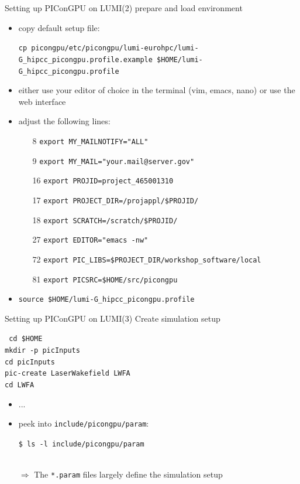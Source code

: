 \documentclass[
  aspectratio=169,
  10pt
]{beamer}
\newcommand{\terminal}[1]{\par\noindent\colorbox{shadecolor}
{\parbox{\dimexpr\textwidth-2\fboxsep\relax}{\texttt{#1}}}}
\begin{document}
\begin{frame}[t,fragile]{Setting up PIConGPU on LUMI}{(2) prepare and load environment}

\begin{itemize}
    \item copy default setup file:
    \terminal{cp picongpu/etc/picongpu/lumi-eurohpc/lumi-G\_hipcc\_picongpu.profile.example \$HOME/lumi-G\_hipcc\_picongpu.profile}

    \item either use your editor of choice in the terminal (vim, emacs, nano) or use the web interface 
    \item adjust the following lines:
    \begin{enumerate}
        \item[8] \texttt{export MY\_MAILNOTIFY="ALL"}
        \item[9] \texttt{export MY\_MAIL="your.mail@server.gov"}
        \item[16] \texttt{export PROJID=project\_465001310}
        \item[17] \texttt{export PROJECT\_DIR=/projappl/\$PROJID/}
        \item[18] \texttt{export SCRATCH=/scratch/\$PROJID/}
        \item[27] \texttt{export EDITOR="emacs -nw"}
        \item[72] \texttt{export PIC\_LIBS=\$PROJECT\_DIR/workshop\_software/local}
        \item[81] \texttt{export PICSRC=\$HOME/src/picongpu}
    \end{enumerate}
\item \terminal{source \$HOME/lumi-G\_hipcc\_picongpu.profile}
    
\end{itemize}

\end{frame}




\begin{frame}[t,fragile]{Setting up PIConGPU on LUMI}{(3) Create simulation setup}
    \terminal{%
        cd \$HOME \\
        mkdir -p picInputs\\
        cd picInputs\\
        pic-create LaserWakefield LWFA \\
        cd LWFA
    }
\begin{itemize}
    \item ...
    \item peek into \texttt{include/picongpu/param}:\\
        \terminal{\$ ls -l include/picongpu/param}\\
        $\Rightarrow$ The \texttt{*.param} files largely define the simulation setup
\end{itemize}

\end{frame}
\end{document}
